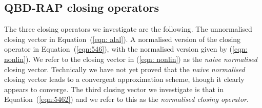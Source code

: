 
\subsection{QBD-RAP closing operators}
The three closing operators we investigate are the following. The unnormalised closing vector in Equation~(\ref{eqn: alal}). A normalised version of the closing operator in Equation~(\ref{eqn:546}), with the normalised version given by (\ref{eqn: nonlin}). We refer to the closing vector in (\ref{eqn: nonlin}) as the \emph{naive normalised} closing vector. Technically we have not yet proved that the \emph{naive normalised} closing vector leads to a convergent approximation scheme, though it clearly appears to converge. The third closing vector we investigate is that in Equation~(\ref{eqn:5462}) and we refer to this as the \emph{normalised closing operator}. 


